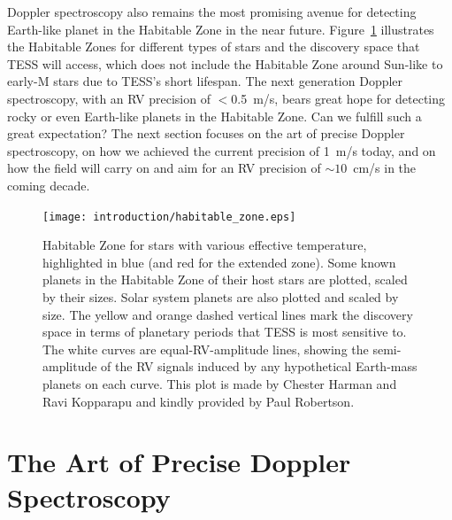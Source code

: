 Doppler spectroscopy also remains the most promising avenue for
detecting Earth-like planet in the Habitable Zone
\citep{1993Icar..101..108K, 2013ApJ...765..131K} in the near
future. Figure~\ref{intro:fig:hz} illustrates the Habitable Zones for
different types of stars and the discovery space that TESS will
access, which does not include the Habitable Zone around Sun-like to
early-M stars due to TESS's short lifespan. The next generation
Doppler spectroscopy, with an RV precision of $<$0.5~m/s, bears great
hope for detecting rocky or even Earth-like planets in the Habitable
Zone. Can we fulfill such a great expectation? The next section
focuses on the art of precise Doppler spectroscopy, on how we achieved
the current precision of 1~m/s today, and on how the field will carry
on and aim for an RV precision of $\sim 10$~cm/s in the coming decade.


\begin{figure}
\centering
\texttt{[image: introduction/habitable\_zone.eps]}
\caption{Habitable Zone for stars with various effective temperature,
  highlighted in blue (and red for the extended zone). Some known
  planets in the Habitable Zone of their host stars are plotted, scaled
  by their sizes. Solar system planets are also plotted and scaled by
  size. The yellow and orange dashed vertical lines mark the discovery
  space in terms of planetary periods that TESS is most sensitive
  to. The white curves are equal-RV-amplitude lines, showing the
  semi-amplitude of the RV signals induced by any hypothetical
  Earth-mass planets on each curve. This plot is made by Chester Harman
  and Ravi Kopparapu and kindly provided by Paul Robertson.
\label{intro:fig:hz}}
\end{figure}



\section{The Art of Precise Doppler Spectroscopy}

